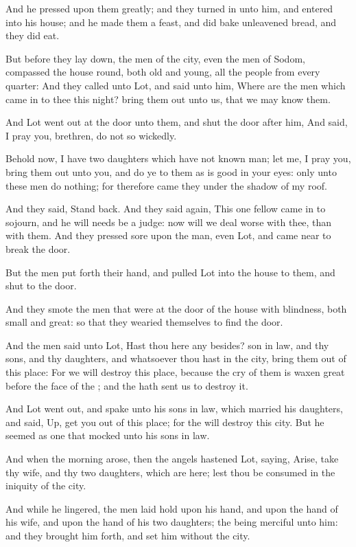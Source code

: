 \verse And he pressed upon them greatly; and they turned in unto him, and entered into his house; and he made them a feast, and did bake unleavened bread, and they did eat.

\verse But before they lay down, the men of the city, even the men of Sodom, compassed the house round, both old and young, all the people from every quarter: \verse And they called unto Lot, and said unto him, Where are the men which came in to thee this night? bring them out unto us, that we may know them.

\verse And Lot went out at the door unto them, and shut the door after him, \verse And said, I pray you, brethren, do not so wickedly.

\verse Behold now, I have two daughters which have not known man; let me, I pray you, bring them out unto you, and do ye to them as is good in your eyes: only unto these men do nothing; for therefore came they under the shadow of my roof.

\verse And they said, Stand back. And they said again, This one fellow came in to sojourn, and he will needs be a judge: now will we deal worse with thee, than with them. And they pressed sore upon the man, even Lot, and came near to break the door.

\verse But the men put forth their hand, and pulled Lot into the house to them, and shut to the door.

\verse And they smote the men that were at the door of the house with blindness, both small and great: so that they wearied themselves to find the door.

\verse And the men said unto Lot, Hast thou here any besides? son in law, and thy sons, and thy daughters, and whatsoever thou hast in the city, bring them out of this place: \verse For we will destroy this place, because the cry of them is waxen great before the face of the \LORD; and the \LORD hath sent us to destroy it.

\verse And Lot went out, and spake unto his sons in law, which married his daughters, and said, Up, get you out of this place; for the \LORD will destroy this city. But he seemed as one that mocked unto his sons in law.

\verse And when the morning arose, then the angels hastened Lot, saying, Arise, take thy wife, and thy two daughters, which are here; lest thou be consumed in the iniquity of the city.

\verse And while he lingered, the men laid hold upon his hand, and upon the hand of his wife, and upon the hand of his two daughters; the \LORD being merciful unto him: and they brought him forth, and set him without the city.


